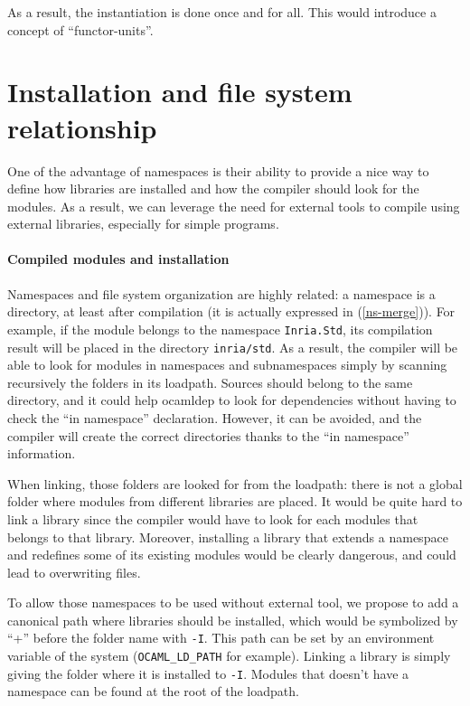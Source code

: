 \documentclass[11pt,a4paper]{article}
\begin{document}
As a result, the instantiation is done once and for all. This would introduce a
concept of ``functor-units''.

\section{Installation and file system relationship}

One of the advantage of namespaces is their ability to provide a nice way to
define how libraries are installed and how the compiler should look for the
modules. As a result, we can leverage the need for external tools to compile
using external libraries, especially for simple programs.

\paragraph{Compiled modules and installation}

Namespaces and file system organization are highly related: a namespace is a
directory, at least after compilation (it is actually expressed in
(\ref{ns-merge})). For example, if the module belongs to the namespace
\texttt{Inria.Std}, its compilation result will be placed in the directory
\texttt{inria/std}. As a result, the compiler will be able to look for modules
in namespaces and subnamespaces simply by scanning recursively the folders in
its loadpath. Sources should belong to the same directory, and it could help
ocamldep to look for dependencies without having to check the ``in namespace''
declaration. However, it can be avoided, and the compiler will create the
correct directories thanks to the ``in namespace'' information.

When linking, those folders are looked for from the loadpath: there is not a
global folder where modules from different libraries are placed. It would be
quite hard to link a library since the compiler would have to look for each
modules that belongs to that library. Moreover, installing a library that
extends a namespace and redefines some of its existing modules would be clearly
dangerous, and could lead to overwriting files.

To allow those namespaces to be used without external tool, we propose to add a
canonical path where libraries should be installed, which would be symbolized by
``+'' before the folder name with \texttt{-I}. This path can be set by an
environment variable of the system (\texttt{OCAML\_LD\_PATH} for
example). Linking a library is simply giving the folder where it is installed to
\texttt{-I}. Modules that doesn't have a namespace can be found at the root of
the loadpath.
\end{document}
